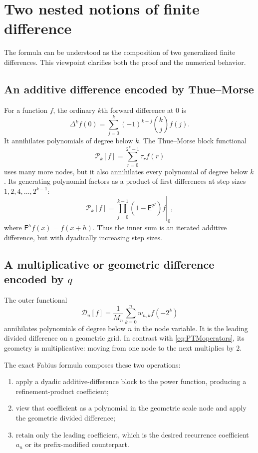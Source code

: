 \documentclass[11pt,oneside]{article}
\theoremstyle{definition}
\theoremstyle{remark}
\newcommand{\tm}{\tau}
\begin{document}
\section{Two nested notions of finite difference}

The formula can be understood as the composition of two generalized finite
differences.  This viewpoint clarifies both the proof and the numerical
behavior.

\subsection{An additive difference encoded by Thue--Morse}

For a function $f$, the ordinary $k$th forward difference at $0$ is
\[
 \Delta^kf(0)=\sum_{j=0}^{k}(-1)^{k-j}\binom{k}{j}f(j).
\]
It annihilates polynomials of degree below $k$.  The Thue--Morse block
functional
\begin{equation}\label{eq:PTMfunctional}
 \mathcal P_k[f]=\sum_{r=0}^{2^k-1}\tm_rf(r)
\end{equation}
uses many more nodes, but it also annihilates every polynomial of degree
below $k$.  Its generating polynomial factors as a product of first
differences at step sizes $1,2,4,\ldots,2^{k-1}$:
\begin{equation}\label{eq:PTMoperators}
 \mathcal P_k[f]
 =\left.\prod_{j=0}^{k-1}(1-\mathsf E^{2^j})f\right|_{0},
\end{equation}
where $\mathsf E^hf(x)=f(x+h)$.  Thus the inner sum is an iterated additive
difference, but with dyadically increasing step sizes.

\subsection{A multiplicative or geometric difference encoded by \texorpdfstring{$q$}{q}}

The outer functional
\[
 \mathcal D_n[f]=\frac1{M_n}\sum_{k=0}^{n}w_{n,k}f(-2^k)
\]
annihilates polynomials of degree below $n$ in the node variable.  It is the
leading divided difference on a geometric grid.  In contrast with
\eqref{eq:PTMoperators}, its geometry is multiplicative: moving from one
node to the next multiplies by $2$.

The exact Fabius formula composes these two operations:
\begin{enumerate}[leftmargin=2.2em]
\item apply a dyadic additive-difference block to the power function,
producing a refinement-product coefficient;
\item view that coefficient as a polynomial in the geometric scale node and
apply the geometric divided difference;
\item retain only the leading coefficient, which is the desired recurrence
coefficient $a_n$ or its prefix-modified counterpart.
\end{enumerate}
\end{document}
